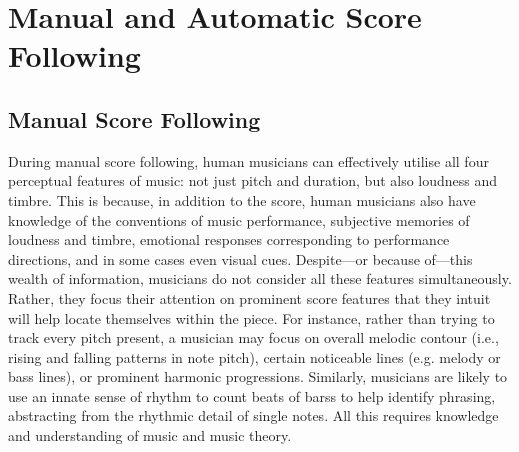 \section{Manual and Automatic Score Following}{\label{section:score_following_approaches}
\subsection{Manual Score Following}{\label{subsection:manual_score_following}}
During manual score following, human musicians can effectively utilise all four perceptual features of music: not just pitch and duration, but also loudness and timbre. This is because, in addition to the score, human musicians also have knowledge of the conventions of music performance, subjective memories of loudness and timbre, emotional responses corresponding to performance directions, and in some cases even visual cues. Despite—or because of—this wealth of information, musicians do not consider all these features simultaneously. Rather, they focus their attention on prominent score features that they intuit will help locate themselves within the piece. For instance, rather than trying to track every pitch present, a musician may focus on overall melodic contour (i.e., rising and falling patterns in note pitch), certain noticeable lines (e.g. melody or bass lines), or prominent \gls{harmonic progression}s. Similarly, musicians are likely to use an innate sense of rhythm to count beats of \gls{bars}s to help identify \gls{phrasing}, abstracting from the rhythmic detail of single notes. All this requires knowledge and understanding of music and music theory.


}
